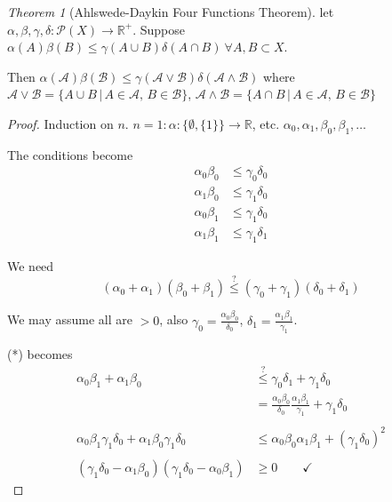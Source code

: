 \documentclass[a4paper]{article}
\theoremstyle{definition}
\theoremstyle{remark}
\theoremstyle{default}
\newtheorem{theorem}{Theorem}
\begin{document}
\begin{theorem}[Ahlswede-Daykin Four Functions Theorem]
	let $\alpha, \beta, \gamma, \delta: \mathcal{P}(X) \to \mathbb{R}^+$.
	Suppose $\alpha(A)\beta(B) \leq \gamma(A \cup B)\delta(A \cap B)\ \forall A, B \subset X$.
	
	Then $\alpha(\mathcal{A})\beta(\mathcal{B}) \leq \gamma(\mathcal{A} \vee \mathcal{B})\delta(\mathcal{A} \wedge \mathcal{B})$
	where $\mathcal{A} \vee \mathcal{B} = \{A \cup B \,|\, A \in \mathcal{A},\, B \in \mathcal{B} \}$,
	$\mathcal{A} \wedge \mathcal{B} = \{A \cap B \,|\, A \in \mathcal{A},\, B \in \mathcal{B} \}$
\end{theorem}
\begin{proof}
	Induction on $n$. $n=1: \alpha: \{\emptyset, \{1\}\} \to \mathbb{R}$, etc. $\alpha_0, \alpha_1, \beta_0, \beta_1, \dots$
	
	The conditions become
	\begin{align*}
		\alpha_0\beta_0 &\leq \gamma_0\delta_0 \\
		\alpha_1\beta_0 &\leq \gamma_1\delta_0 \\
		\alpha_0\beta_1 &\leq \gamma_1\delta_0 \\
		\alpha_1\beta_1 &\leq \gamma_1\delta_1
	\end{align*}
	
	We need
	\begin{equation*}
		(\alpha_0 + \alpha_1)(\beta_0+\beta_1) \overset{?}{\leq} (\gamma_0 + \gamma_1)(\delta_0+\delta_1)
		\tag{*}
	\end{equation*}
	
	We may assume all are $> 0$,
	also $\gamma_0 = \frac{\alpha_0\beta_0}{\delta_0}$,
	$\delta_1 = \frac{\alpha_1\beta_1}{\gamma_1}$.
	
	(*) becomes
	\begin{align*}
		\alpha_0\beta_1+\alpha_1\beta_0 &\overset{?}{\leq} \gamma_0\delta_1 + \gamma_1\delta_0 \\
		&= \frac{\alpha_0\beta_0}{\delta_0}\frac{\alpha_1\beta_1}{\gamma_1} + \gamma_1\delta_0 \\ \\
		\alpha_0\beta_1\gamma_1\delta_0 + \alpha_1\beta_0\gamma_1\delta_0 &\leq \alpha_0\beta_0\alpha_1\beta_1 + (\gamma_1\delta_0)^2 \\ \\		
		(\gamma_1\delta_0 - \alpha_1\beta_0)(\gamma_1\delta_0-\alpha_0\beta_1) & \geq 0 \qquad \checkmark
	\end{align*}
	

\end{proof}
\end{document}
